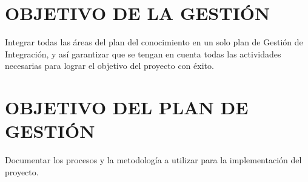 \chapter{OBJETIVO DE LA GESTI\'ON}

Integrar todas las \'areas del plan del conocimiento en un solo plan de Gesti\'on de Integraci\'on, 
y as\'i garantizar que se tengan en cuenta todas las actividades necesarias para lograr el objetivo 
del proyecto con \'exito.

\chapter{OBJETIVO DEL PLAN DE GESTI\'ON}

Documentar los procesos y la metodolog\'ia a utilizar para la implementaci\'on del proyecto.%